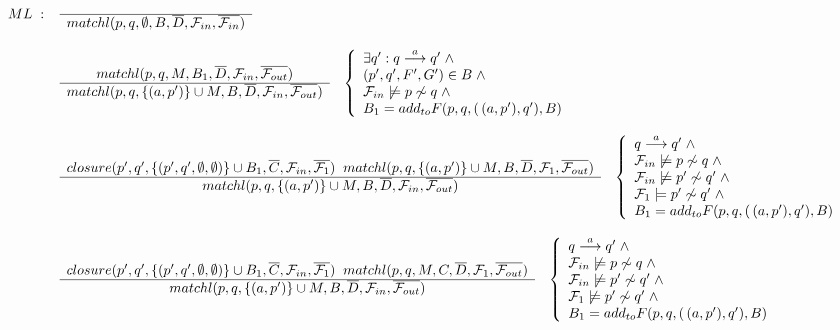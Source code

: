 \begin{figure}
\[\begin{array}{r@{\;\;}c@{\;\;\;\;}l}
ML& : &
\myfrac{}{matchl(p,q,\emptyset,B,\overline{D},{\cal F}_{in},\overline{{\cal F}_{in}})}\\
\\[.5\baselineskip]
& &
\myfrac{matchl(p,q,M,B_1,\overline{D},{\cal F}_{in},\overline{{\cal F}_{out}})}{matchl(p,q,\{(a,p')\}\cup M,B,\overline{D},{\cal F}_{in},\overline{{\cal F}_{out}})}
\;\;\;\left\{
\begin{array}{l}
\exists q':q\der{a}q'\;\wedge\\
(p',q',F',G')\in B\;\wedge\\
{\cal F}_{in}\not\models p\not\sim q\;\wedge\\
B_1=add_{to}F(p,q,(\,(a,p'),q'),B)
\end{array}
\right.\\
\\[.5\baselineskip]
& &
\myfrac{closure(p',q',\{(p',q',\emptyset,\emptyset)\}\cup B_1,\overline{C},{\cal F}_{in},\overline{{\cal F}_{1}})\;\;matchl(p,q,\{(a,p')\}\cup M,B,\overline{D},{\cal F}_{1},\overline{{\cal F}_{out}})}{matchl(p,q,\{(a,p')\}\cup M,B,\overline{D},{\cal F}_{in},\overline{{\cal F}_{out}})}
\;\;\;\left\{
\begin{array}{l}
q\der{a}q'\;\wedge\\
{\cal F}_{in}\not\models p\not\sim q\;\wedge\\
{\cal F}_{in}\not\models p'\not\sim q'\;\wedge\\
{\cal F}_{1}\models p'\not\sim q'\;\wedge\\
B_1=add_{to}F(p,q,(\,(a,p'),q'),B)
\end{array}
\right.\\
\\[.5\baselineskip]
& &
\myfrac{closure(p',q',\{(p',q',\emptyset,\emptyset)\}\cup B_1,\overline{C},{\cal F}_{in},\overline{{\cal F}_{1}})\;\;matchl(p,q,M,C,\overline{D},{\cal F}_{1},\overline{{\cal F}_{out}})}{matchl(p,q,\{(a,p')\}\cup M,B,\overline{D},{\cal F}_{in},\overline{{\cal F}_{out}})}
\;\;\;\left\{
\begin{array}{l}
q\der{a}q'\;\wedge\\
{\cal F}_{in}\not\models p\not\sim q\;\wedge\\
{\cal F}_{in}\not\models p'\not\sim q'\;\wedge\\
{\cal F}_{1}\not\models p'\not\sim q'\;\wedge\\
B_1=add_{to}F(p,q,(\,(a,p'),q'),B)
\end{array}
\right.\\
\\[.5\baselineskip]

\end{array}\]
\end{figure}
